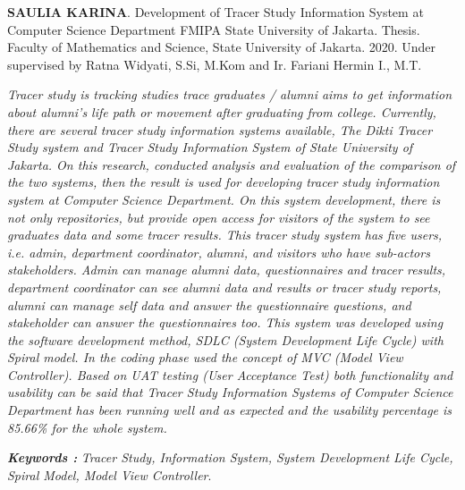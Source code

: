 \documentclass{jtetiskripsi}
\begin{document}
\begin{abstracteng}
\textbf{SAULIA KARINA}. Development of Tracer Study Information System at Computer Science Department FMIPA State University of Jakarta. Thesis. Faculty of Mathematics and Science, State University of Jakarta. 2020. Under supervised by Ratna Widyati, S.Si, M.Kom and Ir. Fariani Hermin I., M.T.
\vskip1cm
	
\textit{
Tracer study is tracking studies trace graduates / alumni aims to get information about alumni’s life path or movement after graduating from college. Currently, there are several tracer study information systems available, The Dikti Tracer Study system and Tracer Study Information System of State University of Jakarta. On this research, conducted analysis and evaluation of the comparison of the two systems, then the result is used for developing tracer study information system at Computer Science Department. On this system development, there is not only repositories, but provide open access for visitors of the system to see graduates data and some tracer results. This tracer study system has five users, i.e. admin, department coordinator, alumni, and visitors who have sub-actors stakeholders. Admin can manage alumni data, questionnaires and tracer results, department coordinator can see alumni data and results or tracer study reports, alumni can manage self data and answer the questionnaire questions, and stakeholder can answer the questionnaires too. This system was developed using the software development method, SDLC (System Development Life Cycle) with Spiral model. In the coding phase used the concept of MVC (Model View Controller). Based on UAT testing (User Acceptance Test) both functionality and usability can be said that Tracer Study Information Systems of Computer Science Department has been running well and as expected and the usability percentage is 85.66\% for the whole system. }
    
\bigskip
\noindent
\textbf{\emph{Keywords :}} \emph{Tracer Study, Information System, System Development Life Cycle, Spiral Model, Model View Controller}. 
	
\end{abstracteng}

\end{document}

